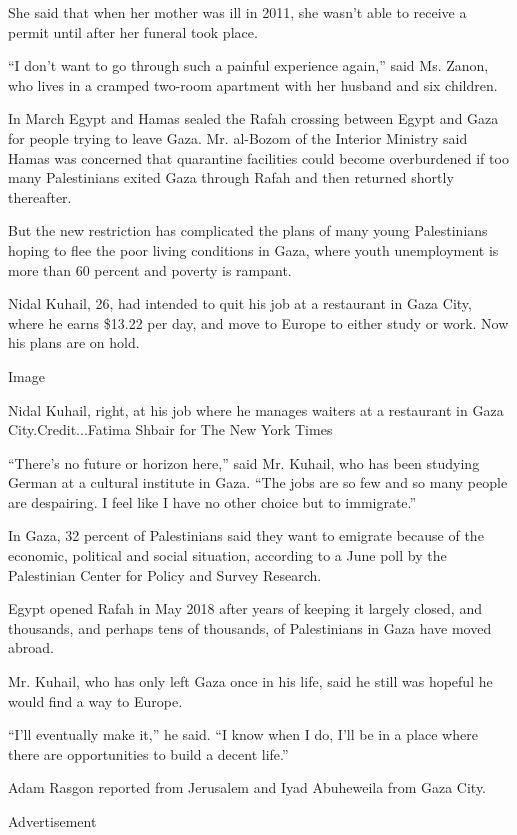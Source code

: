 She said that when her mother was ill in 2011, she wasn't able to
receive a permit until after her funeral took place.

``I don't want to go through such a painful experience again,'' said Ms.
Zanon, who lives in a cramped two-room apartment with her husband and
six children.

In March Egypt and Hamas sealed the Rafah crossing between Egypt and
Gaza for people trying to leave Gaza. Mr. al-Bozom of the Interior
Ministry said Hamas was concerned that quarantine facilities could
become overburdened if too many Palestinians exited Gaza through Rafah
and then returned shortly thereafter.

But the new restriction has complicated the plans of many young
Palestinians hoping to flee the poor living conditions in Gaza, where
youth unemployment is more than 60 percent and poverty is rampant.

Nidal Kuhail, 26, had intended to quit his job at a restaurant in Gaza
City, where he earns \$13.22 per day, and move to Europe to either study
or work. Now his plans are on hold.

Image

Nidal Kuhail, right, at his job where he manages waiters at a restaurant
in Gaza City.Credit...Fatima Shbair for The New York Times

``There's no future or horizon here,'' said Mr. Kuhail, who has been
studying German at a cultural institute in Gaza. ``The jobs are so few
and so many people are despairing. I feel like I have no other choice
but to immigrate.''

In Gaza, 32 percent of Palestinians said they want to emigrate because
of the economic, political and social situation, according to a June
poll by the Palestinian Center for Policy and Survey Research.

Egypt opened Rafah in May 2018 after years of keeping it largely closed,
and thousands, and perhaps tens of thousands, of Palestinians in Gaza
have moved abroad.

Mr. Kuhail, who has only left Gaza once in his life, said he still was
hopeful he would find a way to Europe.

``I'll eventually make it,'' he said. ``I know when I do, I'll be in a
place where there are opportunities to build a decent life.''

Adam Rasgon reported from Jerusalem and Iyad Abuheweila from Gaza City.

Advertisement

